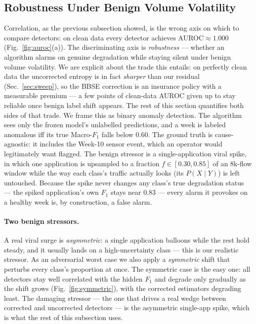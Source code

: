 \subsection{Robustness Under Benign Volume Volatility}
\label{sec:robustness}
Correlation, as the previous subsection showed, is the wrong axis on which to
compare detectors: on clean data every detector achieves AUROC$\approx1.000$
(Fig.~\ref{fig:auroc}(a)). The discriminating axis is \emph{robustness} --- whether
an algorithm alarms on genuine degradation while staying silent under benign volume
volatility. We are explicit about the trade this entails: on perfectly clean data
the uncorrected entropy is in fact \emph{sharper} than our residual (Sec.~\ref{sec:sweep}),
so the BBSE correction is an insurance policy with a measurable premium --- a few
points of clean-data AUROC given up to stay reliable once benign label shift
appears. The rest of this section quantifies both sides of that trade. We frame this as binary anomaly detection. The algorithm sees only the
frozen model's unlabelled predictions, and a week is labeled anomalous iff its
true Macro-$F_1$ falls below 0.60. The ground truth is cause-agnostic: it includes
the Week-10 sensor event, which an operator would legitimately want flagged. The
benign stressor is a single-application viral spike, in which one application is
upsampled to a fraction $f\in[0.30,0.85]$ of an 8k-flow window while the way each
class's traffic actually looks (its $P(X\mid Y)$) is left untouched. Because the
spike never changes any class's true degradation status --- the spiked
application's own $F_1$ stays near 0.83 --- every alarm it provokes on a healthy
week is, by construction, a false alarm.

\paragraph{Two benign stressors.} A real viral surge is \emph{asymmetric}: a
single application balloons while the rest hold steady, and it usually lands on a
high-uncertainty class --- this is our realistic stressor. As an adversarial worst
case we also apply a \emph{symmetric} shift that perturbs every class's proportion
at once. The symmetric case is the easy one: all detectors stay well correlated
with the hidden $F_1$ and degrade only gradually as the shift grows
(Fig.~\ref{fig:symmetric}), with the corrected estimators degrading least. The
damaging stressor --- the one that drives a real wedge between corrected and
uncorrected detectors --- is the asymmetric single-app spike, which is what the
rest of this subsection uses.


